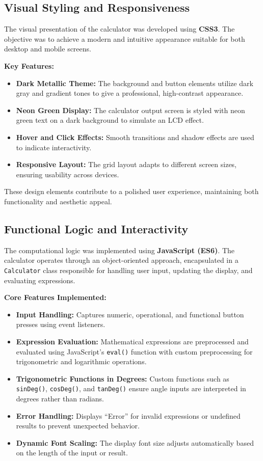\documentclass[a4paper,12pt,oneside]{report}
\numberwithin{equation}{chapter}
\numberwithin{figure}{chapter}
\numberwithin{table}{chapter}
\begin{document}
\subsection{Visual Styling and Responsiveness}

The visual presentation of the calculator was developed using \textbf{CSS3}. The objective was to achieve a modern and intuitive appearance suitable for both desktop and mobile screens. 

\textbf{Key Features:}
\begin{itemize}
    \item \textbf{Dark Metallic Theme:} The background and button elements utilize dark gray and gradient tones to give a professional, high-contrast appearance.
    \item \textbf{Neon Green Display:} The calculator output screen is styled with neon green text on a dark background to simulate an LCD effect.
    \item \textbf{Hover and Click Effects:} Smooth transitions and shadow effects are used to indicate interactivity.
    \item \textbf{Responsive Layout:} The grid layout adapts to different screen sizes, ensuring usability across devices.
\end{itemize}

These design elements contribute to a polished user experience, maintaining both functionality and aesthetic appeal.

\bigskip
\noindent
\subsection{Functional Logic and Interactivity}

The computational logic was implemented using \textbf{JavaScript (ES6)}. The calculator operates through an object-oriented approach, encapsulated in a \texttt{Calculator} class responsible for handling user input, updating the display, and evaluating expressions.

\textbf{Core Features Implemented:}
\begin{itemize}
    \item \textbf{Input Handling:} Captures numeric, operational, and functional button presses using event listeners.
    \item \textbf{Expression Evaluation:} Mathematical expressions are preprocessed and evaluated using JavaScript’s \texttt{eval()} function with custom preprocessing for trigonometric and logarithmic operations.
    \item \textbf{Trigonometric Functions in Degrees:} Custom functions such as \texttt{sinDeg()}, \texttt{cosDeg()}, and \texttt{tanDeg()} ensure angle inputs are interpreted in degrees rather than radians.
    \item \textbf{Error Handling:} Displays “Error” for invalid expressions or undefined results to prevent unexpected behavior.
    \item \textbf{Dynamic Font Scaling:} The display font size adjusts automatically based on the length of the input or result.
\end{itemize}
\end{document}

